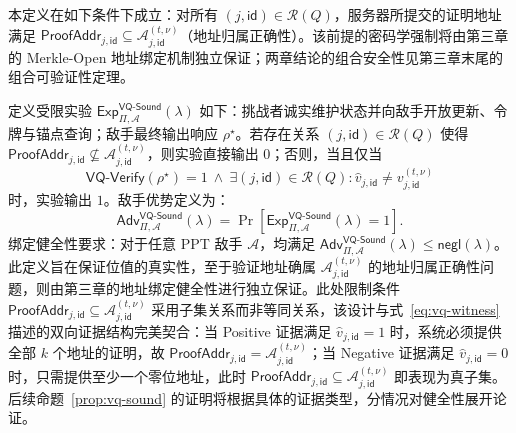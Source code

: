 \begin{definition}[条件绑定健全性]\label{def:vq-binding-soundness}
本定义在如下条件下成立：对所有 $(j,\mathsf{id})\in\mathcal{R}(Q)$，服务器所提交的证明地址满足 $\mathsf{ProofAddr}_{j,\mathsf{id}}\subseteq \mathcal{A}_{j,\mathsf{id}}^{(t,\nu)}$（地址归属正确性）。该前提的密码学强制将由第三章的 Merkle-Open 地址绑定机制独立保证；两章结论的组合安全性见第三章末尾的组合可验证性定理。

定义受限实验 $\mathsf{Exp}_{\Pi,\mathcal{A}}^{\mathsf{VQ\text{-}Sound}}(\lambda)$ 如下：挑战者诚实维护状态并向敌手开放更新、令牌与锚点查询；敌手最终输出响应 $\rho^\star$。若存在关系 $(j,\mathsf{id})\in\mathcal{R}(Q)$ 使得 $\mathsf{ProofAddr}_{j,\mathsf{id}}\not\subseteq \mathcal{A}_{j,\mathsf{id}}^{(t,\nu)}$，则实验直接输出 $0$；否则，当且仅当
\begin{equation}
\mathsf{VQ\text{-}Verify}(\rho^\star)=1\ \land\ \exists(j,\mathsf{id})\in\mathcal{R}(Q):\widehat{v}_{j,\mathsf{id}}\neq v_{j,\mathsf{id}}^{(t,\nu)}
\end{equation}
时，实验输出 $1$。敌手优势定义为：
\begin{equation}
\mathsf{Adv}_{\Pi,\mathcal{A}}^{\mathsf{VQ\text{-}Sound}}(\lambda)=\Pr\!\left[\mathsf{Exp}_{\Pi,\mathcal{A}}^{\mathsf{VQ\text{-}Sound}}(\lambda)=1\right]\text{.}
\end{equation}
绑定健全性要求：对于任意 PPT 敌手 $\mathcal{A}$，均满足 $\mathsf{Adv}_{\Pi,\mathcal{A}}^{\mathsf{VQ\text{-}Sound}}(\lambda)\le \mathsf{negl}(\lambda)$。此定义旨在保证位值的真实性，至于验证地址确属 $\mathcal{A}_{j,\mathsf{id}}^{(t,\nu)}$ 的地址归属正确性问题，则由第三章的地址绑定健全性进行独立保证。此处限制条件 $\mathsf{ProofAddr}_{j,\mathsf{id}}\subseteq \mathcal{A}_{j,\mathsf{id}}^{(t,\nu)}$ 采用子集关系而非等同关系，该设计与式~\eqref{eq:vq-witness} 描述的双向证据结构完美契合：当 Positive 证据满足 $\widehat{v}_{j,\mathsf{id}}=1$ 时，系统必须提供全部 $k$ 个地址的证明，故 $\mathsf{ProofAddr}_{j,\mathsf{id}}=\mathcal{A}_{j,\mathsf{id}}^{(t,\nu)}$；当 Negative 证据满足 $\widehat{v}_{j,\mathsf{id}}=0$ 时，只需提供至少一个零位地址，此时 $\mathsf{ProofAddr}_{j,\mathsf{id}}\subseteq \mathcal{A}_{j,\mathsf{id}}^{(t,\nu)}$ 即表现为真子集。后续命题~\ref{prop:vq-sound} 的证明将根据具体的证据类型，分情况对健全性展开论证。
\end{definition} 

